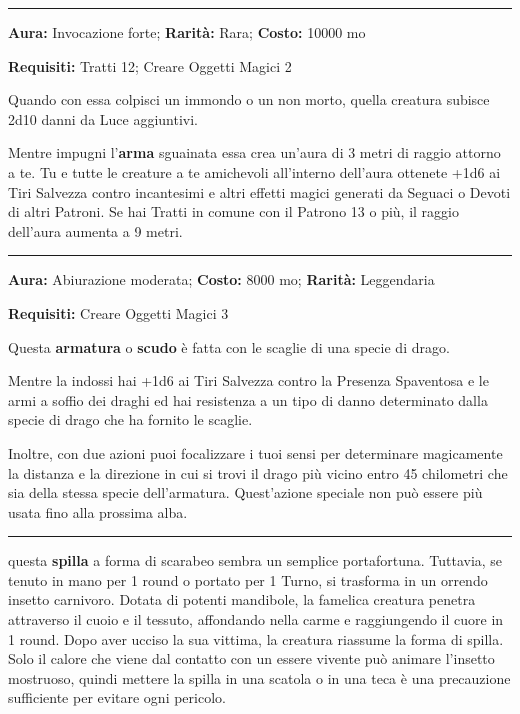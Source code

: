 \begin{multicols}{2}
\smallskip\noindent\rule{\linewidth}{2pt}  \hypertarget{Sacra}{}\medskip{}\noindent\label{Sacra}

\textbf{Aura:} Invocazione forte; \textbf{Rarità:} Rara; \textbf{Costo:} 10000 mo

\textbf{Requisiti:} Tratti  12; Creare Oggetti Magici 2

Quando con essa colpisci un immondo o un non morto, quella creatura subisce 2d10 danni da Luce aggiuntivi.

Mentre impugni l'\textbf{arma} sguainata essa crea un'aura di 3 metri di raggio attorno a te. Tu e tutte le creature a te amichevoli all'interno dell'aura ottenete +1d6 ai Tiri Salvezza contro incantesimi e altri effetti magici generati da Seguaci o Devoti di altri Patroni. Se hai Tratti in comune con il Patrono 13 o più, il raggio dell'aura aumenta a 9 metri.

\smallskip\noindent\rule{\linewidth}{2pt}  \hypertarget{ScagliediDrago}{}\medskip{}\noindent\label{ScagliediDrago}

\textbf{Aura:} Abiurazione moderata; \textbf{Costo:} 8000 mo; \textbf{Rarità:} Leggendaria

\textbf{Requisiti:} Creare Oggetti Magici 3

Questa \textbf{armatura} o \textbf{scudo} è fatta con le scaglie di una specie di drago.

Mentre la indossi hai +1d6 ai Tiri Salvezza contro la Presenza Spaventosa e le armi a soffio dei draghi ed hai resistenza a un tipo di danno determinato dalla specie di drago che ha fornito le scaglie.

Inoltre, con due azioni puoi focalizzare i tuoi sensi per determinare magicamente la distanza e la direzione in cui si trovi il drago più vicino entro 45 chilometri che sia della stessa specie dell'armatura. Quest'azione speciale non può essere più usata fino alla prossima alba.

\smallskip\noindent\rule{\linewidth}{2pt}  \hypertarget{ScarabeodellaMorte}{}\medskip{}\noindent\label{ScarabeodellaMorte}

questa \textbf{spilla} a forma di scarabeo sembra un semplice portafortuna. Tuttavia, se tenuto in mano per 1 round o portato per 1 Turno, si trasforma in un orrendo insetto carnivoro. Dotata di potenti mandibole, la famelica creatura penetra attraverso il cuoio e il tessuto, affondando nella carme e raggiungendo il cuore in 1 round. Dopo aver ucciso la sua vittima, la creatura riassume la forma di spilla. Solo il calore che viene dal contatto con un essere vivente può animare l'insetto mostruoso, quindi mettere la spilla in una scatola o in una teca è una precauzione sufficiente per evitare ogni pericolo.


\end{multicols}
